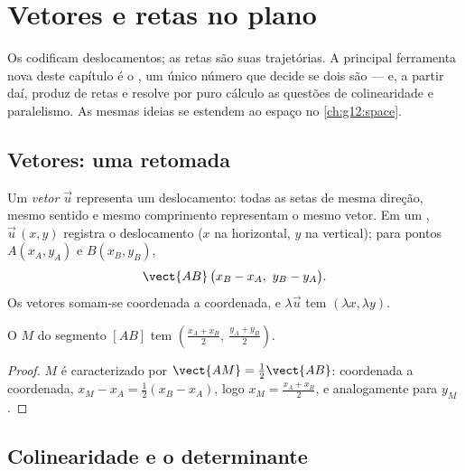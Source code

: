 \chapter{Vetores e retas no plano}\label{ch:g11:vect}

Os  codificam deslocamentos; as retas são suas trajetórias. A
principal ferramenta nova deste capítulo é o \emph{}, um único
número que decide se dois  são  --- e, a partir daí,
produz  de retas e resolve por puro cálculo as questões de
colinearidade e paralelismo. As mesmas ideias se estendem ao espaço no
\cref{ch:g12:space}.

\section{Vetores: uma retomada}

\begin{definition}\label{def:g11:vect:vector}
Um \emph{vetor} $\vec u$ representa um deslocamento: todas
as setas de mesma direção, mesmo sentido e mesmo comprimento representam
o mesmo vetor. Em um , $\vec u\,(x, y)$ registra o
deslocamento ($x$ na horizontal, $y$ na vertical); para pontos
$A(x_A, y_A)$ e $B(x_B, y_B)$,
\[
\vect{AB}\,\bigl(x_B - x_A,\ y_B - y_A\bigr).
\]
Os vetores somam-se coordenada a coordenada, e $\lambda\vec u$ tem
 $(\lambda x, \lambda y)$.
\end{definition}

\begin{proposition}\label{prop:g11:vect:midpoint}
O  $M$ do segmento $[AB]$ tem 
$\left(\frac{x_A + x_B}{2},\ \frac{y_A + y_B}{2}\right)$.
\end{proposition}

\begin{proof}
$M$ é caracterizado por $\vect{AM} = \frac12\vect{AB}$: coordenada a
coordenada, $x_M - x_A = \frac12(x_B - x_A)$, logo
$x_M = \frac{x_A + x_B}{2}$, e analogamente para $y_M$.
\end{proof}

\section{Colinearidade e o determinante}

